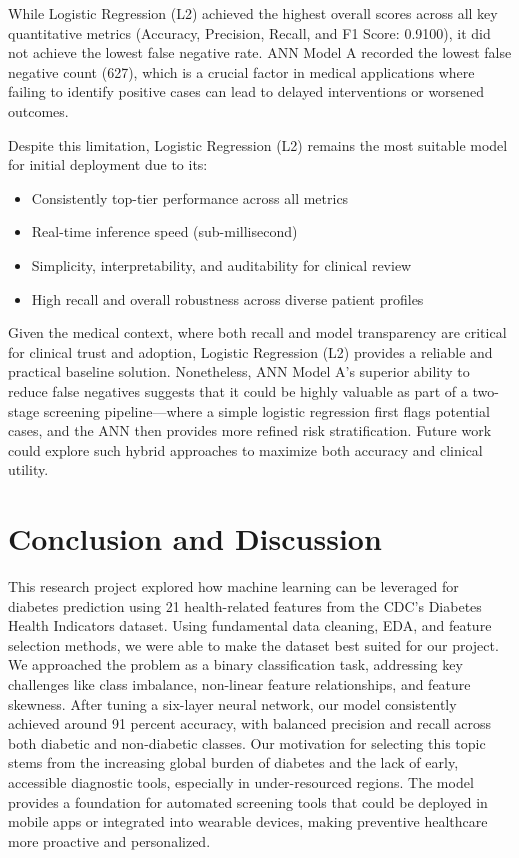 \documentclass[conference]{IEEEtran}
\begin{document}
While Logistic Regression (L2) achieved the highest overall scores across all key quantitative metrics (Accuracy, Precision, Recall, and F1 Score: 0.9100), it did not achieve the lowest false negative rate. ANN Model A recorded the lowest false negative count (627), which is a crucial factor in medical applications where failing to identify positive cases can lead to delayed interventions or worsened outcomes.

Despite this limitation, Logistic Regression (L2) remains the most suitable model for initial deployment due to its:
\begin{itemize}
\item Consistently top-tier performance across all metrics
\item Real-time inference speed (sub-millisecond)
\item Simplicity, interpretability, and auditability for clinical review
\item High recall and overall robustness across diverse patient profiles
\end{itemize}

Given the medical context, where both recall and model transparency are critical for clinical trust and adoption, Logistic Regression (L2) provides a reliable and practical baseline solution. Nonetheless, ANN Model A’s superior ability to reduce false negatives suggests that it could be highly valuable as part of a two-stage screening pipeline—where a simple logistic regression first flags potential cases, and the ANN then provides more refined risk stratification. Future work could explore such hybrid approaches to maximize both accuracy and clinical utility.

\section{Conclusion and Discussion}
This research project explored how machine learning can be leveraged for diabetes prediction using 21 health-related features from the CDC's Diabetes Health Indicators dataset. Using fundamental data cleaning, EDA, and feature selection methods, we were able to make the dataset best suited for our project. We approached the problem as a binary classification task, addressing key challenges like class imbalance, non-linear feature relationships, and feature skewness. After tuning a six-layer neural network, our model consistently achieved around 91 percent accuracy, with balanced precision and recall across both diabetic and non-diabetic classes. Our motivation for selecting this topic stems from the increasing global burden of diabetes and the lack of early, accessible diagnostic tools, especially in under-resourced regions. The model provides a foundation for automated screening tools that could be deployed in mobile apps or integrated into wearable devices, making preventive healthcare more proactive and personalized. \\
\end{document}
